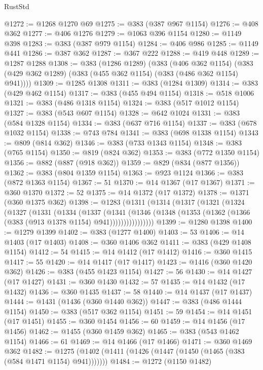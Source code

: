 \begin{lexlean}{RustStd}
\begin{coremodule}
@1272 := @1268 @1270 @69
@1275 := @383 (@387 @967 @1154)
@1276 := @408 @362
@1277 := @406 @1276
@1279 := @1063 @396 @1154
@1280 := @1149 @398
@1283 := @383 (@387 @979 @1154)
@1284 := @406 @986
@1285 := @1149 @441
@1286 := @387 @362
@1287 := @367 @222
@1288 := @419 @448
@1289 := @1287 @1288
@1308 := @383
    (@1286 @1289)
    (@383
      (@406 @362 @1154)
      (@383 (@429 @362 @1289) (@383 (@455 @362 @1154) (@383 (@486 @362 @1154) @941))))
@1309 := @1285 @1308
@1311 := @383 (@1284 @1309)
@1314 := @383 (@429 @462 @1154)
@1317 := @383 (@455 @494 @1154)
@1318 := @518 @1006
@1321 := @383 (@486 @1318 @1154)
@1324 := @383 (@517 @1012 @1154)
@1327 := @383 (@543 @607 @1154)
@1328 := @642 @1024
@1331 := @383 (@584 @1328 @1154)
@1334 := @383 (@637 @716 @1154)
@1337 := @383 (@678 @1032 @1154)
@1338 := @743 @784
@1341 := @383 (@698 @1338 @1154)
@1343 := @809 (@814 @362)
@1346 := @383 (@733 @1343 @1154)
@1348 := @383 (@765 @1154)
@1350 := @819 (@824 @362)
@1353 := @383 (@772 @1350 @1154)
@1356 := @882 (@887 (@918 @362))
@1359 := @829 (@834 (@877 @1356))
@1362 := @383 (@804 @1359 @1154)
@1363 := @923 @1124
@1366 := @383 (@872 @1363 @1154)
@1367 := 51
@1370 := @14 @1367 (@17 @1367)
@1371 := @360 @1370
@1372 := 52
@1375 := @14 @1372 (@17 @1372)
@1378 := @1371 (@360 @1375 @362)
@1398 := @1283
    (@1311
      (@1314
        (@1317
          (@1321
            (@1324
              (@1327
                (@1331
                  (@1334
                    (@1337
                      (@1341
                        (@1346
                          (@1348 (@1353 (@1362 (@1366 (@383 (@913 @1378 @1154) @941))))))))))))))))
@1399 := @1280 @1398
@1400 := @1279 @1399
@1402 := @383 (@1277 @1400)
@1403 := 53
@1406 := @14 @1403 (@17 @1403)
@1408 := @360 @1406 @362
@1411 := @383 (@429 @1408 @1154)
@1412 := 54
@1415 := @14 @1412 (@17 @1412)
@1416 := @360 @1415
@1417 := 55
@1420 := @14 @1417 (@17 @1417)
@1423 := @1416 (@360 @1420 @362)
@1426 := @383 (@455 @1423 @1154)
@1427 := 56
@1430 := @14 @1427 (@17 @1427)
@1431 := @360 @1430
@1432 := 57
@1435 := @14 @1432 (@17 @1432)
@1436 := @360 @1435
@1437 := 58
@1440 := @14 @1437 (@17 @1437)
@1444 := @1431 (@1436 (@360 @1440 @362))
@1447 := @383 (@486 @1444 @1154)
@1450 := @383 (@517 @362 @1154)
@1451 := 59
@1454 := @14 @1451 (@17 @1451)
@1455 := @360 @1454
@1456 := 60
@1459 := @14 @1456 (@17 @1456)
@1462 := @1455 (@360 @1459 @362)
@1465 := @383 (@543 @1462 @1154)
@1466 := 61
@1469 := @14 @1466 (@17 @1466)
@1471 := @360 @1469 @362
@1482 := @1275 (@1402 (@1411 (@1426 (@1447 (@1450 (@1465 (@383 (@584 @1471 @1154) @941)))))))
@1484 := @1272 (@1150 @1482)

\end{coremodule}
\end{lexlean}
